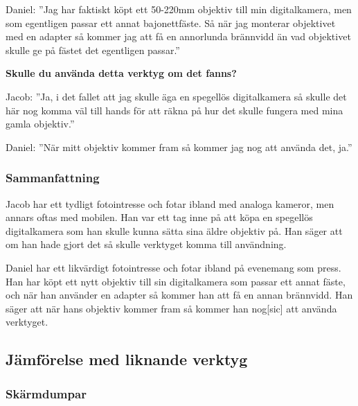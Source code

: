 \documentclass[11pt]{article}
\begin{document}
\sloppy
Daniel: ”Jag har faktiskt köpt ett 50-220mm objektiv till min digitalkamera, men
som egentligen passar ett annat bajonettfäste. Så när jag monterar objektivet
med en adapter så kommer jag att få en annorlunda brännvidd än vad objektivet
skulle ge på fästet det egentligen passar.”\par
\fussy

\textbf{Skulle du använda detta verktyg om det fanns?}\par

Jacob: ”Ja, i det fallet att jag skulle äga en spegellös digitalkamera så
skulle det här nog komma väl till hands för att räkna på hur det skulle fungera
med mina gamla objektiv.”\par

Daniel: ”När mitt objektiv kommer fram så kommer jag nog att använda det, ja.”
\par


\subsubsection{Sammanfattning}
\sloppy
Jacob har ett tydligt fotointresse och fotar ibland med analoga kameror, men
annars oftas med mobilen. Han var ett tag inne på att köpa en spegellös
digitalkamera som han skulle kunna sätta sina äldre objektiv på. Han säger att
om han hade gjort det så skulle verktyget komma till användning.\par

Daniel har ett likvärdigt fotointresse och fotar ibland på evenemang som press.
Han har köpt ett nytt objektiv till sin digitalkamera som passar ett annat
fäste, och när han använder en adapter så kommer han att få en annan brännvidd.
Han säger att när hans objektiv kommer fram så kommer han nog[sic] att använda
verktyget. \par
\fussy

\clearpage

\subsection{Jämförelse med liknande verktyg}
\subsubsection{Skärmdumpar}
\renewcommand{\figurename}{Fig.}
\end{document}
